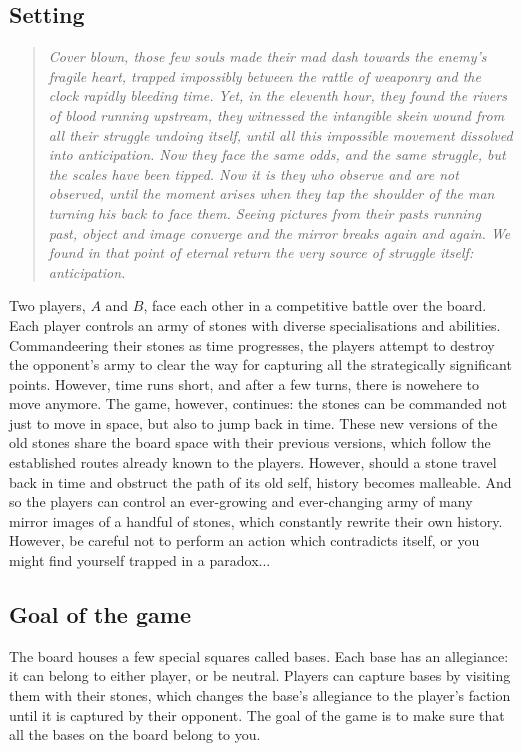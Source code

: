 \documentclass[12pt]{article}
\begin{document}
	\subsection{Setting}
	\begin{quote}
	\textit{Cover blown, those few souls made their mad dash towards the enemy's fragile heart, trapped impossibly between the rattle of weaponry and the clock rapidly bleeding time. Yet, in the eleventh hour, they found the rivers of blood running upstream, they witnessed the intangible skein wound from all their struggle undoing itself, until all this impossible movement dissolved into anticipation. Now they face the same odds, and the same struggle, but the scales have been tipped. Now it is they who observe and are not observed, until the moment arises when they tap the shoulder of the man turning his back to face them. Seeing pictures from their pasts running past, object and image converge and the mirror breaks again and again. We found in that point of eternal return the very source of struggle itself: anticipation.}
	\end{quote}
	Two players, $A$ and $B$, face each other in a competitive battle over the board. Each player controls an army of stones with diverse specialisations and abilities. Commandeering their stones as time progresses, the players attempt to destroy the opponent's army to clear the way for capturing all the strategically significant points. However, time runs short, and after a few turns, there is nowehere to move anymore. The game, however, continues: the stones can be commanded not just to move in space, but also to jump back in time. These new versions of the old stones share the board space with their previous versions, which follow the established routes already known to the players. However, should a stone travel back in time and obstruct the path of its old self, history becomes malleable. And so the players can control an ever-growing and ever-changing army of many mirror images of a handful of stones, which constantly rewrite their own history. However, be careful not to perform an action which contradicts itself, or you might find yourself trapped in a paradox...
	
	\subsection{Goal of the game}
	
	The board houses a few special squares called bases. Each base has an allegiance: it can belong to either player, or be neutral. Players can capture bases by visiting them with their stones, which changes the base's allegiance to the player's faction until it is captured by their opponent. The goal of the game is to make sure that all the bases on the board belong to you.
	
\end{document}
